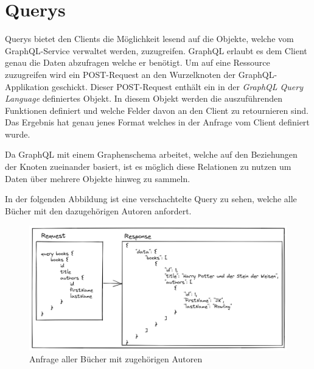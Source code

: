 

\section{Querys}

Querys bietet den Clients die Möglichkeit lesend auf die Objekte, welche vom GraphQL-Service verwaltet werden, zuzugreifen.
GraphQL erlaubt es dem Client genau die Daten abzufragen welche er benötigt.
Um auf eine Ressource zuzugreifen wird ein POST-Request an den Wurzelknoten der GraphQL-Applikation geschickt.
Dieser POST-Request enthält ein in der \textit{GraphQL Query Language} definiertes Objekt.
In diesem Objekt werden die auszuführenden Funktionen definiert und welche Felder davon an den Client zu retournieren sind.
Das Ergebnis hat genau jenes Format welches in der Anfrage vom Client definiert wurde.

Da GraphQL mit einem Graphenschema arbeitet, welche auf den Beziehungen der Knoten zueinander basiert, ist es möglich diese Relationen zu nutzen um Daten über mehrere Objekte hinweg zu sammeln.
\newline


In der folgenden Abbildung ist eine verschachtelte Query zu sehen, welche alle Bücher mit den dazugehörigen Autoren anfordert.

\begin{figure}[H]
    \includegraphics[width=\textwidth]{pics/query_book_with_result.png}
    \caption{Anfrage aller Bücher mit zugehörigen Autoren}
\end{figure}

